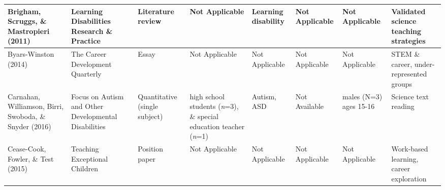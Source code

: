 \documentclass[11.5pt]{sig-alternate}
\begin{document}
\begin{@twocolumnfalse}
\begin{table}
\begin{tabular}{m{0.72in}m{0.72in}m{0.72in}m{0.72in}m{0.72in}m{0.72in}m{0.72in}m{0.72in}}
Brigham, Scruggs, \& Mastropieri (2011)                 & Learning Disabilities Research \& Practice                      & Literature review                     &  \centering Not Applicable                                                                               & Learning disability                               &  \centering Not Applicable                                                                                         &  \centering Not Applicable                                                   & Validated science teaching strategies                                                                    \\ \hline
Byars-Winston (2014)                                    & The Career Development Quarterly                                & Essay                                 &  \centering Not Applicable                                                                               &  \centering Not Applicable                                    &  \centering Not Applicable                                                                                         &  \centering Not Applicable                                                   & STEM \& career, under-represented groups                                                                 \\ \hline
Carnahan, Williamson, Birri, Swoboda, \& Snyder (2016)  & Focus on Autism and Other Developmental Disabilities            & Quantitative (single subject)         & high school students (\textit{n}=3), \& special education teacher (\textit{n}=1)                               & Autism, ASD                                       &  \centering Not Available                                                                                          & males (N=3) ages 15-16                                           & Science text reading                                                                                     \\ \hline
Cease-Cook, Fowler, \& Test (2015)                      & Teaching Exceptional Children                                   & Position paper                        &  \centering Not Applicable                                                                               &  \centering Not Applicable                                    &  \centering Not Applicable                                                                                         &  \centering Not Applicable                                                   & Work-based learning, career exploration                                                                  \\ \hline

\end{tabular}
\end{table}
\end{@twocolumnfalse}
\end{document}
